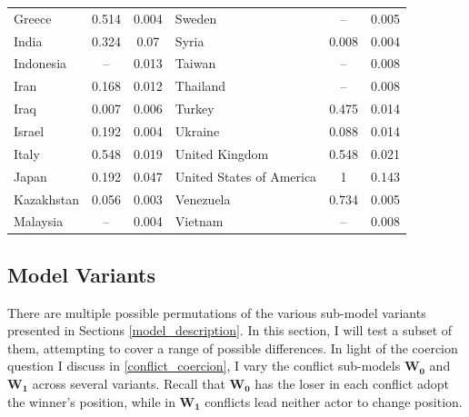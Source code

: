 \begin{landscape}
\begin{table}
\begin{tabular}{lcc|lcc}
    Greece                           & 0.514    & 0.004      & Sweden                   & --       & 0.005      \\
    India                            & 0.324    & 0.07       & Syria                    & 0.008    & 0.004      \\
    Indonesia                        & --       & 0.013      & Taiwan                   & --       & 0.008      \\
    Iran                             & 0.168    & 0.012      & Thailand                 & --       & 0.008      \\
    Iraq                             & 0.007    & 0.006      & Turkey                   & 0.475    & 0.014      \\
    Israel                           & 0.192    & 0.004      & Ukraine                  & 0.088    & 0.014      \\
    Italy                            & 0.548    & 0.019      & United Kingdom           & 0.548    & 0.021      \\
    Japan                            & 0.192    & 0.047      & United States of America & 1        & 0.143      \\
    Kazakhstan                       & 0.056    & 0.003      & Venezuela                & 0.734    & 0.005      \\
    Malaysia                         & --      & 0.004      & Vietnam                  & --      & 0.008     \\
    
    \hline
\end{tabular}
\tableSpace
\end{table}

\end{landscape}


\subsection{Model Variants}

There are multiple possible permutations of the various sub-model variants presented in Sections \ref{model_description}. In this section, I will test a subset of them, attempting to cover a range of possible differences. In light of the coercion question I discuss in \ref{conflict_coercion}, I vary the conflict sub-models $\mathbf{W_0}$ and $\mathbf{W_1}$ across several variants. Recall that $\mathbf{W_0}$ has the loser in each conflict adopt the winner's position, while in $\mathbf{W_1}$ conflicts lead neither actor to change position.

